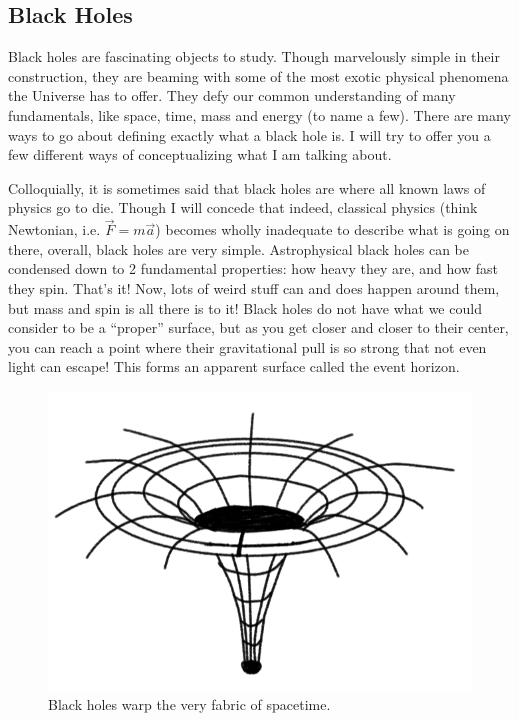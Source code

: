 \subsection{Black Holes}

Black holes are fascinating objects to study. Though marvelously simple in their construction, they are beaming with some of the most exotic physical phenomena the Universe has to offer. They defy our common understanding of many fundamentals, like space, time, mass and energy (to name a few). There are many ways to go about defining exactly what a black hole is. I will try to offer you a few different ways of conceptualizing what I am talking about.

Colloquially, it is sometimes said that black holes are where all known laws of physics go to die. Though I will concede that indeed, classical physics (think Newtonian, i.e. $\vec{F}=m\vec{a}$) becomes wholly inadequate to describe what is going on there, overall, black holes are very simple. Astrophysical black holes can be condensed down to 2 fundamental properties: how heavy they are, and how fast they spin. That's it! Now, lots of weird stuff can and does happen around them, but mass and spin is all there is to it! 
Black holes do not have what we could consider to be a ``proper'' surface, but as you get closer and closer to their center, you can reach a point where their gravitational pull is so strong that not even light can escape! This forms an apparent surface called the event horizon.

\begin{figure}[h!]
    \centering
    \includegraphics[width=0.6\linewidth]{img/bh.png}
    \caption{Black holes warp the very fabric of spacetime.}
    \label{fig:bh}
\end{figure}

